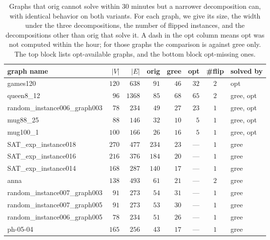 \documentclass[conference]{IEEEtran}
\newcommand{\OrigDecom}{\textsf{orig}\xspace}
\newcommand{\HeurDecom}{\textsf{gree}\xspace}
\newcommand{\OptDecom}{\textsf{opt}\xspace}
\begin{document}
\begin{table}[t]
  \centering
  \caption{Graphs that \OrigDecom cannot solve within $30$ minutes but a narrower
  decomposition can, with identical behavior on both variants. For each graph, we
  give its size, the width under the three decompositions, the number of flipped instances, and the decompositions other than \OrigDecom
  that solve it. A dash in the \OptDecom column means \OptDecom was not computed
  within the hour; for those graphs the comparison is against \HeurDecom only. The
  top block lists \OptDecom-available graphs, and the bottom block \OptDecom-missing
  ones.}
  \label{tab:flips-common}
  \begin{tabular}{l|rr|rrr|cl}
    \hline
    graph name & $|V|$ & $|E|$ & \OrigDecom & \HeurDecom & \OptDecom & \#flip & solved by \\
    \hline
    \textsf{games120}                    & $120$ & $638$  & $91$  & $46$ & $32$ & $2$ & \OptDecom \\
    \textsf{queen8\_12}                  & $96$  & $1368$ & $85$  & $68$ & $65$ & $2$ & \HeurDecom, \OptDecom \\
    \textsf{random\_instance006\_graph003} & $78$  & $234$  & $49$  & $27$ & $23$ & $1$ & \HeurDecom, \OptDecom \\
    \textsf{mug88\_25}                   & $88$  & $146$  & $32$  & $10$ & $5$  & $1$ & \HeurDecom, \OptDecom \\
    \textsf{mug100\_1}                   & $100$ & $166$  & $26$  & $16$ & $5$  & $1$ & \HeurDecom, \OptDecom \\
    \hline
    \textsf{SAT\_exp\_instance018}       & $270$ & $477$  & $234$ & $23$ & ---  & $1$ & \HeurDecom \\
    \textsf{SAT\_exp\_instance016}       & $216$ & $376$  & $184$ & $20$ & ---  & $1$ & \HeurDecom \\
    \textsf{SAT\_exp\_instance014}       & $168$ & $287$  & $140$ & $17$ & ---  & $1$ & \HeurDecom \\
    \textsf{anna}                        & $138$ & $493$  & $61$  & $21$ & ---  & $2$ & \HeurDecom \\
    \textsf{random\_instance007\_graph003} & $91$  & $273$  & $54$  & $31$ & ---  & $1$ & \HeurDecom \\
    \textsf{random\_instance007\_graph005} & $91$  & $273$  & $53$  & $30$ & ---  & $1$ & \HeurDecom \\
    \textsf{random\_instance006\_graph005} & $78$  & $234$  & $51$  & $26$ & ---  & $1$ & \HeurDecom \\
    \textsf{ph-05-04}                    & $165$ & $256$  & $43$  & $17$ & ---  & $1$ & \HeurDecom \\
    \hline
  \end{tabular}
\end{table}
\end{document}
